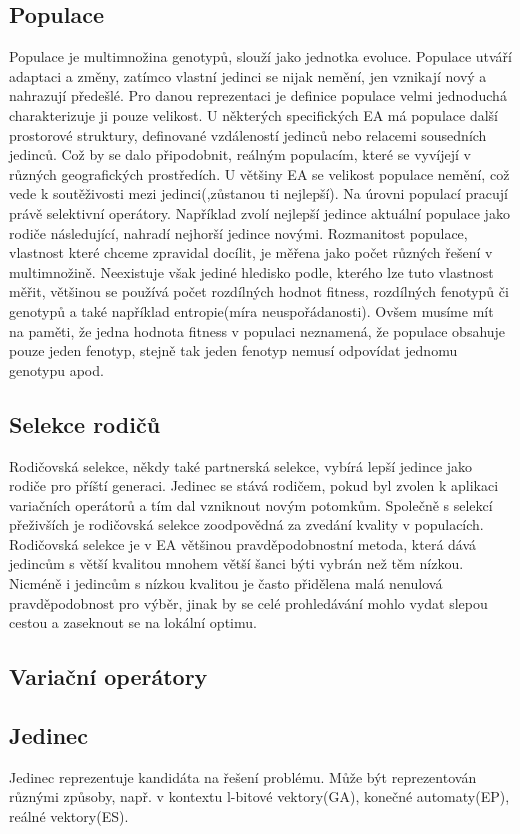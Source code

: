 \subsection{Populace}
Populace je multimnožina genotypů, slouží jako jednotka evoluce. Populace utváří adaptaci a změny, zatímco vlastní jedinci se nijak nemění, jen vznikají nový a nahrazují předešlé. Pro danou reprezentaci je definice populace velmi jednoduchá charakterizuje ji pouze velikost. U některých specifických EA má populace další prostorové struktury, definované vzdáleností jedinců nebo relacemi sousedních jedinců. Což by se dalo připodobnit, reálným populacím, které se vyvíjejí v různých geografických prostředích. U většiny EA se velikost populace nemění, což vede k soutěživosti mezi jedinci(,zůstanou ti nejlepší). Na úrovni populací pracují právě selektivní operátory. Například zvolí nejlepší jedince aktuální populace jako rodiče následující, nahradí nejhorší jedince novými. Rozmanitost populace, vlastnost které chceme zpravidal docílit, je měřena jako počet různých řešení v multimnožině. Neexistuje však jediné hledisko podle, kterého lze tuto vlastnost měřit, většinou se používá počet rozdílných hodnot fitness, rozdílných fenotypů či genotypů a také například entropie(míra neuspořádanosti). Ovšem musíme mít na paměti, že jedna hodnota fitness v populaci neznamená, že populace obsahuje pouze jeden fenotyp, stejně tak jeden fenotyp nemusí odpovídat jednomu genotypu apod. 
\subsection{Selekce rodičů}
Rodičovská selekce, někdy také partnerská selekce, vybírá lepší jedince jako rodiče pro příští generaci. Jedinec se stává rodičem, pokud byl zvolen k aplikaci variačních operátorů a tím dal vzniknout novým potomkům. Společně s selekcí přeživších je rodičovská selekce zoodpovědná za zvedání kvality v populacích. Rodičovská selekce je v EA většinou pravděpodobnostní metoda, která dává jedincům s větší kvalitou mnohem větší šanci býti vybrán než těm nízkou. Nicméně i jedincům s nízkou kvalitou je často přidělena malá nenulová pravděpodobnost pro výběr, jinak by se celé prohledávání mohlo vydat slepou cestou a zaseknout se na lokální optimu. 
\subsection{Variační operátory}

\subsection{Jedinec}
Jedinec reprezentuje kandidáta na řešení problému. Může být reprezentován různými způsoby, např. v kontextu l-bitové vektory(GA), konečné automaty(EP), reálné vektory(ES). 
